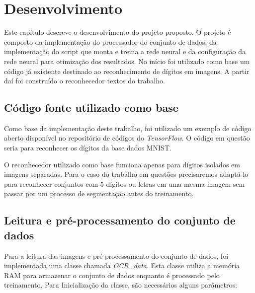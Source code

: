 \chapter{Desenvolvimento}

Este capítulo descreve o desenvolvimento do projeto proposto. O
projeto é composto da implementação do processador do conjunto de
dados, da implementação do script que monta e treina a rede neural e
da configuração da rede neural para otimização dos resultados. No
início foi utilizado como base um código já existente destinado ao
reconhecimento de dígitos em imagens. A partir daí foi construído o
reconhecedor textos do trabalho.

\section{Código fonte utilizado como base}

Como base da implementação deste trabalho, foi utilizado um exemplo
de código aberto disponível no repositório de códigos do
\textit{TensorFlow}\cite{mnistCode}. O código em questão seria para
reconhecer os dígitos da base dados MNIST\cite{mnist}.

O reconhecedor utilizado como base funciona apenas para dígitos
isolados em imagens separadas. Para o caso do trabalho em questões
precisaremos adaptá-lo para reconhecer conjuntos com 5 dígitos ou
letras em uma mesma imagem sem passar por um processo de segmentação
antes do treinamento.

\section{Leitura e pré-processamento do conjunto de dados}

Para a leitura das imagens e pré-processamento do conjunto de dados, foi
implementada uma classe chamada \textit{OCR\_data}. Esta classe utiliza
a memória RAM para armazenar o conjunto de dados enquanto é processado
pelo treinamento. Para Inicialização da classe, são necessários alguns
parâmetros:

